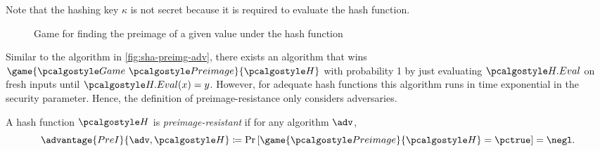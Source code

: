 Note that the hashing key $\kappa$ is not secret because it is required to evaluate the hash function.

\begin{figure}[tbhp]
  \begin{center}
    \begin{tcolorbox}[width=5cm]
      \begin{pchstack}[center]
      \end{pchstack}
    \end{tcolorbox}
  \end{center}
  \caption{Game for finding the preimage of a given value under the hash function \label{fig:break-hash}}
\end{figure}

Similar to the algorithm in \autoref{fig:sha-preimg-adv}, there exists an algorithm that wins $\game{\Game~\algo{Preimage}}{\algo{H}}$ with probability 1 by just evaluating $\algo{H.Eval}$ on fresh inputs until $\algo{H.Eval}(x) = y$.
However, for adequate hash functions this algorithm runs in time exponential in the security parameter.
Hence, the definition of preimage-resistance only considers \ppt adversaries.

\begin{definition}\label{def:preimage-resistance}
  A hash function $\algo{H}$ is \emph{preimage-resistant} if for any \ppt algorithm $\adv$,
 \[
  \advantage{PreI}{\adv, \algo{H}} \defeq \pr{\game{\algo{Preimage}}{\algo{H}} = \pctrue} = \negl.
 \]
\end{definition}


